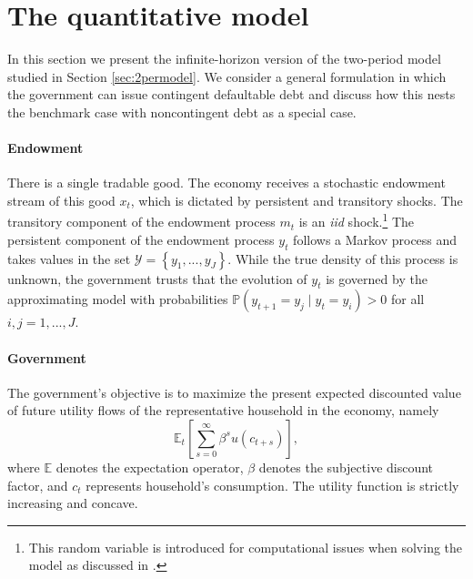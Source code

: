 \section{The quantitative model \label{sec:quantmodel}}

In this section we present the infinite-horizon version of the two-period model studied in Section \ref{sec:2permodel}. We consider a general formulation in which the government can issue contingent defaultable debt and discuss how this nests the benchmark case with noncontingent debt as a special case. %

\paragraph{Endowment} There is a single tradable good. The economy receives a stochastic endowment stream of this good $x_{t}$, which is dictated by persistent and transitory shocks. The transitory component of the endowment process $m_t$ is an \emph{iid} shock.\footnote{This random variable is introduced for computational issues when solving the model as discussed in \cite{Chatty}.} The persistent component of the endowment process $y_t$ follows a Markov process and takes values in the set $\mathcal{Y} = \left\{ y_1, ..., y_J \right\}$. While the true density of this process is unknown, the government trusts that the evolution of $y_t$ is governed by the approximating model with probabilities $\mathbb{P}(y_{t+1} = y_j \mid y_{t} = y_i)> 0$ for all $i,j=1,...,J$.  

\paragraph{Government} The government's objective is to maximize the present expected discounted value of future utility flows of the representative household in the economy, namely
\[\mathbb{E}_t \left[ \sum_{s=0}^{\infty} \beta^{s} u\left( c_{t+s} \right)\right],\]
where $\mathbb{E}$ denotes the expectation operator, $\beta$ denotes the subjective discount factor, and $c_t$ represents household's consumption. The utility function is strictly increasing and concave.


